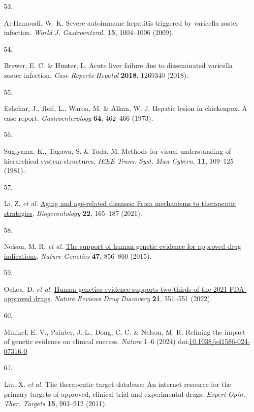 \documentclass[
]{article}
\newlength{\cslhangindent}
\newlength{\csllabelwidth}
\newenvironment{CSLReferences}[2] %
 {\begin{list}{}{%
  \setlength{\itemindent}{0pt}
  \setlength{\leftmargin}{0pt}
  \setlength{\parsep}{0pt}
  \ifodd #1
   \setlength{\leftmargin}{\cslhangindent}
   \setlength{\itemindent}{-1\cslhangindent}
  \fi
  \setlength{\itemsep}{#2\baselineskip}}}
 {\end{list}}
\newcommand{\CSLLeftMargin}[1]{\parbox[t]{\csllabelwidth}{\strut#1\strut}}
\newcommand{\CSLRightInline}[1]{\parbox[t]{\linewidth - \csllabelwidth}{\strut#1\strut}}
\begin{document}
\begin{CSLReferences}{0}{0}
\CSLLeftMargin{53. }%
\CSLRightInline{Al-Hamoudi, W. K. Severe autoimmune hepatitis triggered
by varicella zoster infection. \emph{World J. Gastroenterol.}
\textbf{15}, 1004--1006 (2009).}

\CSLLeftMargin{54. }%
\CSLRightInline{Brewer, E. C. \& Hunter, L. Acute liver failure due to
disseminated varicella zoster infection. \emph{Case Reports Hepatol}
\textbf{2018}, 1269340 (2018).}

\CSLLeftMargin{55. }%
\CSLRightInline{Eshchar, J., Reif, L., Waron, M. \& Alkan, W. J. Hepatic
lesion in chickenpox. A case report. \emph{Gastroenterology}
\textbf{64}, 462--466 (1973).}

\CSLLeftMargin{56. }%
\CSLRightInline{Sugiyama, K., Tagawa, S. \& Toda, M. Methods for visual
understanding of hierarchical system structures. \emph{IEEE Trans. Syst.
Man Cybern.} \textbf{11}, 109--125 (1981).}

\CSLLeftMargin{57. }%
\CSLRightInline{Li, Z. \emph{et al.}
\href{https://doi.org/10.1007/s10522-021-09910-5}{Aging and age‐related
diseases: From mechanisms to therapeutic strategies}.
\emph{Biogerontology} \textbf{22}, 165--187 (2021).}

\CSLLeftMargin{58. }%
\CSLRightInline{Nelson, M. R. \emph{et al.}
\href{https://doi.org/10.1038/ng.3314}{The support of human genetic
evidence for approved drug indications}. \emph{Nature Genetics}
\textbf{47}, 856--860 (2015).}

\CSLLeftMargin{59. }%
\CSLRightInline{Ochoa, D. \emph{et al.}
\href{https://doi.org/10.1038/d41573-022-00120-3}{Human genetics
evidence supports two-thirds of the 2021 FDA-approved drugs}.
\emph{Nature Reviews Drug Discovery} \textbf{21}, 551--551 (2022).}

\CSLLeftMargin{60. }%
\CSLRightInline{Minikel, E. V., Painter, J. L., Dong, C. C. \& Nelson,
M. R. Refining the impact of genetic evidence on clinical success.
\emph{Nature} 1--6 (2024)
doi:\href{https://doi.org/10.1038/s41586-024-07316-0}{10.1038/s41586-024-07316-0}.}

\CSLLeftMargin{61. }%
\CSLRightInline{Liu, X. \emph{et al.} The therapeutic target database:
An internet resource for the primary targets of approved, clinical trial
and experimental drugs. \emph{Expert Opin. Ther. Targets} \textbf{15},
903--912 (2011).}


\end{CSLReferences}
\end{document}
